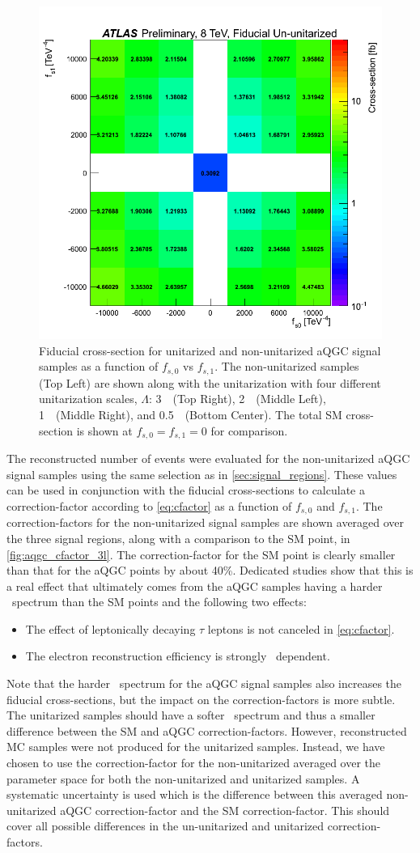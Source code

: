 \begin{figure}[ht!]
\includegraphics[width=.45\textwidth]{figures/aQGC/fiducial_xsec/www_3l_aqgc_fiducial_p5TeV_noratio.png}
\caption{Fiducial cross-section for unitarized and non-unitarized aQGC signal samples as a function of $f_{s,0}$ vs $f_{s,1}$.
The non-unitarized samples (Top Left) are shown along with the unitarization with 
four different unitarization scales, $\Lambda$: 3~\TeV~(Top Right),
2~\TeV~(Middle Left), 1~\TeV~(Middle Right), and 0.5~\TeV~(Bottom Center).
The total SM cross-section is shown at $f_{s,0}=f_{s,1}=0$ for comparison.}
\label{fig:aqgc_fiducial_xsec_3l}
\end{figure}



The reconstructed number of events were evaluated for the non-unitarized
aQGC signal samples using the same selection as in \sec\ref{sec:signal_regions}.
These values can be used in conjunction with the fiducial cross-sections
to calculate a correction-factor according to \eqn\eqref{eq:cfactor} as a function 
of $f_{s,0}$ and $f_{s,1}$. The correction-factors for the non-unitarized signal samples
are shown averaged over the three signal regions, along with a comparison to the SM point,
in \fig\ref{fig:aqgc_cfactor_3l}.
The correction-factor for the SM point is clearly smaller than that for the aQGC
points by about 40\%. Dedicated studies show that this is a real effect 
that ultimately comes from the aQGC samples having a harder \pt~spectrum
than the SM points and the following two effects:
\begin{itemize}
\item The effect of leptonically decaying $\tau$ leptons is not 
canceled in \eqn\eqref{eq:cfactor}.
\item The electron reconstruction efficiency is strongly \pt~dependent.
\end{itemize}
Note that the harder \pt~spectrum for the aQGC signal samples also 
increases the fiducial cross-sections, but the impact on the correction-factors is more subtle.
The unitarized samples should have a softer \pt~spectrum and thus a
smaller difference between the SM and aQGC correction-factors. However,
reconstructed MC samples were not produced for the unitarized samples.
Instead, we have chosen to use the 
correction-factor for the non-unitarized averaged over the parameter space for 
both the non-unitarized and unitarized samples.  A systematic uncertainty  
is used which is the difference between this averaged non-unitarized
aQGC correction-factor and the SM correction-factor. This should cover all possible differences
in the un-unitarized and unitarized correction-factors.

